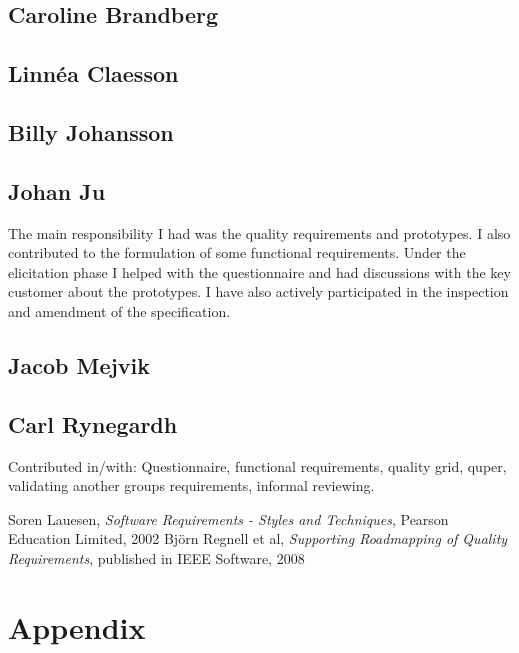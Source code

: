 \documentclass[10pt,a4paper]{article}
\begin{document}
\subsection{Caroline Brandberg}

\subsection{Linn\'ea Claesson}

\subsection{Billy Johansson}

\subsection{Johan Ju}
The main responsibility I had was the quality requirements and prototypes. I also contributed to the formulation of some functional requirements. Under the elicitation phase I helped with the questionnaire and had discussions with the key customer about the prototypes. I have also actively participated in the inspection and amendment of the specification.

\subsection{Jacob Mejvik}

\subsection{Carl Rynegardh}
Contributed in/with: Questionnaire, functional requirements, quality grid, quper, validating another groups requirements, informal reviewing.

\begin{thebibliography}{99}
	Soren Lauesen,
  	\emph{Software Requirements - Styles and Techniques},
  	Pearson Education Limited, 2002
	Björn Regnell et al,
	\emph{Supporting Roadmapping of Quality Requirements},
	published in IEEE Software, 2008

\end{thebibliography}
\newpage
\section{Appendix}
\end{document}

